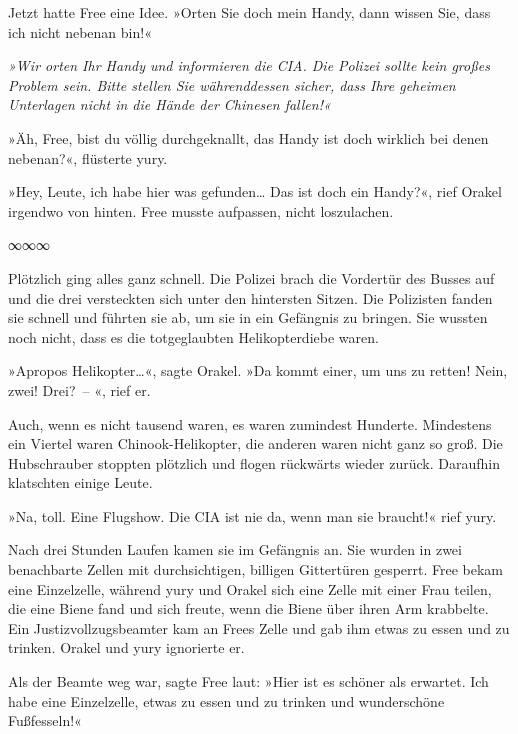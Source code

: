 Jetzt hatte Free eine Idee. »Orten Sie doch mein Handy, dann wissen Sie, dass ich nicht nebenan bin!«

\textit{»Wir orten Ihr Handy und informieren die CIA. Die Polizei sollte kein großes Problem sein. Bitte stellen Sie währenddessen sicher, dass Ihre geheimen Unterlagen nicht in die Hände der Chinesen fallen!«}

\begin{small}»Äh, Free, bist du völlig durchgeknallt, das Handy ist doch wirklich bei denen nebenan?«, flüsterte yury.\end{small}

»Hey, Leute, ich habe hier was gefunden… Das ist doch ein Handy?«, rief Orakel irgendwo von hinten. Free musste aufpassen, nicht loszulachen.

\begin{center}
    ∞∞∞
\end{center}

Plötzlich ging alles ganz schnell. Die Polizei brach die Vordertür des Busses auf und die drei versteckten sich unter den hintersten Sitzen. Die Polizisten fanden sie schnell und führten sie ab, um sie in ein Gefängnis zu bringen. Sie wussten noch nicht, dass es die totgeglaubten Helikopterdiebe waren.

»Apropos Helikopter…«, sagte Orakel. »Da kommt einer, um uns zu retten! Nein, zwei! Drei?~– «, rief er.

Auch, wenn es nicht tausend waren, es waren zumindest Hunderte. Mindestens ein Viertel waren Chinook-Helikopter, die anderen waren nicht ganz so groß. Die Hubschrauber stoppten plötzlich und flogen rückwärts wieder zurück. Daraufhin klatschten einige Leute.

»Na, toll. Eine Flugshow. Die CIA ist nie da, wenn man sie braucht!« rief yury.

Nach drei Stunden Laufen kamen sie im Gefängnis an. Sie wurden in zwei benachbarte Zellen mit durchsichtigen, billigen Gittertüren gesperrt. Free bekam eine Einzelzelle, während yury und Orakel sich eine Zelle mit einer Frau teilen, die eine Biene fand und sich freute, wenn die Biene über ihren Arm krabbelte. Ein Justizvollzugsbeamter kam an Frees Zelle und gab ihm etwas zu essen und zu trinken. Orakel und yury ignorierte er.

Als der Beamte weg war, sagte Free laut: »Hier ist es schöner als erwartet. Ich habe eine Einzelzelle, etwas zu essen und zu trinken und wunderschöne Fußfesseln!«

